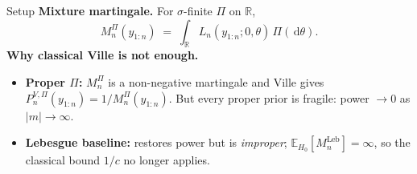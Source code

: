 \documentclass[final]{beamer}
\newcommand{\E}{\mathbb{E}}
\newcommand{\dd}{\,\mathrm{d}}
\newcommand{\Leb}{\mathrm{Leb}}
\newlength{\colwidth}
\begin{document}
\begin{frame}[t]
\begin{columns}[t]
\begin{column}{\colwidth}
\begin{block}{Setup}
    \textbf{Mixture martingale.} For $\sigma$-finite $\Pi$ on $\mathbb R$,
    \[
      M_n^{\Pi}(y_{1:n}) \;=\; \int_{\mathbb R} L_n(y_{1:n};0,\theta)\,\Pi(\dd\theta).
    \]
    \textbf{Why classical Ville is not enough.}
\begin{itemize}
  \setlength\itemsep{0.08cm}
  \item \textbf{Proper $\Pi$:} $M_n^\Pi$ is a non-negative martingale and Ville gives $P_n^{V,\Pi}(y_{1:n})=1/M_n^\Pi(y_{1:n})$. But \alert{every proper prior is fragile}: power $\to 0$ as $|m|\to\infty$.
  \item \textbf{Lebesgue baseline:} restores power but is \emph{improper}; $\E_{H_0}[M_n^{\Leb}]=\infty$, so the classical bound $1/c$ no longer applies.
\end{itemize}

  \end{block}
\end{column}


\end{columns}
\end{frame}
\end{document}
